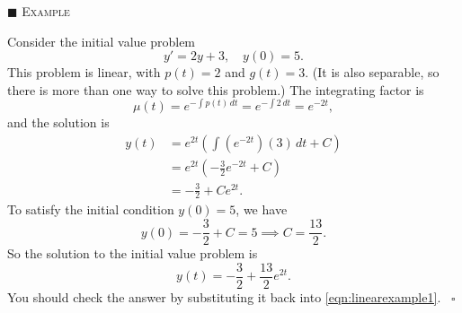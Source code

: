 \documentclass[reqno]{immbook}
\numberwithin{equation}{chapter}
\numberwithin{question}{section}
\numberwithin{theorem}{chapter}
\numberwithin{figure}{chapter}
\theoremstyle{definition}
\newenvironment{xexample}%
{%

\medskip\noindent\addtocounter{example}{1}$\blacksquare$ \textsc{Example \theexample}\hspace*{1em}%
}%
{%
~\hfill$\square$

\medskip
}
\begin{document}
\begin{xexample}
Consider the initial value problem
\begin{equation}
   y' = 2y + 3, \quad y(0) = 5.
\label{eqn:linearexample1}
\end{equation}
This problem is linear, with $p(t)=2$ and $g(t) = 3$.
(It is also separable, so there is more than one way
to solve this problem.)
The integrating factor is
\begin{equation}
   \mu(t) = e^{-\int p(t)\,dt} = e^{-\int 2\, dt}
      = e^{-2t},
\end{equation}
and the solution is
\begin{equation}
\begin{split}
   y(t) & = e^{2t} \left( \int \left(e^{-2t}\right)\left(3\right)\,dt + C\right) \\
        & = e^{2t} \left( -\frac{3}{2} e^{-2t} +C \right) \\
	& = -\frac{3}{2} + Ce^{2t}.
\end{split}
\end{equation}
To satisfy the initial condition $y(0)=5$, we have
\begin{equation}
   y(0) = -\frac{3}{2} + C = 5 \implies C = \frac{13}{2} .
\end{equation}
So the solution to the initial value problem is
\begin{equation}
   y(t) = -\frac{3}{2} + \frac{13}{2}e^{2t}.
\end{equation}
You should check the answer by substituting it back
into \eqref{eqn:linearexample1}.
\end{xexample}
\end{document}
